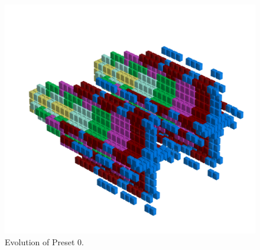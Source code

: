 \clearpage                                                                 
\begin{figure}[H]                                                          
  \centering                                                             
  \begin{adjustbox}{width=14cm,center}                                   
  \includegraphics[width=14cm]{src/presets/pattern0-45.png}%
  \end{adjustbox}                                                        
\caption{Evolution of Preset 0.}                                           
\end{figure}                                                               
\clearpage                                                                 
                                                                           
